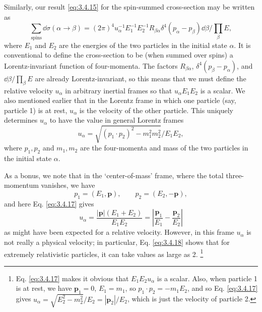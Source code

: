 Similarly, our result \eqref{eq:3.4.15} for the spin-summed cross-section may be written as
\[
 \sum_{\mathrm{spins}}\dd\sigma(\alpha\to\beta)
 =(2\pi)^4u_\alpha^{-1}E_1^{-1}E_2^{-1}R_{\beta\alpha}
 \delta^4(p_\alpha-p_\beta)\dd\beta/\prod_\beta E,
\]
where $E_1$ and $E_2$ are the energies of the two particles in the initial state $\alpha$.
It is conventional to define the cross-section to be (when summed over spins) a Lorentz-invariant
function of four-momenta. The factors $R_{\beta\alpha}$, $\delta^4(p_\beta-p_\alpha)$, and
$\dd\beta/\prod_\beta E$ are already Lorentz-invariant, so this means that we must define the
relative velocity $u_\alpha$ in arbitrary inertial frames so that $u_\alpha E_1E_2$ is a scalar.
We also mentioned earlier that in the Lorentz frame in which one particle (say, particle 1) is
at rest, $u_\alpha$ is the velocity of the other particle. This uniquely determines $u_\alpha$
to have the value in general Lorentz frames
\begin{equation}
 u_\alpha=\sqrt{(p_1\cdot p_2)^2-m_1^2m_2^2}\big/E_1E_2,
 \tag{3.4.17}\label{eq:3.4.17}
\end{equation}
where $p_1,p_2$ and $m_1,m_2$ are the four-momenta and mass of the two particles in the initial
state $\alpha$.

As a bonus, we note that in the `center-of-mass' frame, where the total three-momentum vanishes,
we have
\[
 p_1=(E_1,\mathbf{p}),\qquad p_2=(E_2,-\mathbf{p}),
\]
and here Eq. \eqref{eq:3.4.17} gives
\begin{equation}
 u_\alpha=\frac{|\mathbf{p}|(E_1+E_2)}{E_1E_2}
 =\left|\frac{\mathbf{p}_1}{E_1}-\frac{\mathbf{p}_2}{E_2}\right|
 \tag{3.4.18}\label{eq:3.4.18}
\end{equation}
as might have been expected for a relative velocity. However, in this frame $u_\alpha$ is not
really a physical velocity; in particular, Eq. \eqref{eq:3.4.18} shows that for extremely relativistic
particles, it can take values as large as 2.
\footnote{Eq. \eqref{eq:3.4.17} makes it obvious that $E_1E_2u_\alpha$ is a scalar. Also, when particle 1
is at rest, we have $\mathbf{p}_1=0$, $E_1=m_1$, so $p_1\cdot p_2=-m_1E_2$, and so Eq. \eqref{eq:3.4.17}
gives $u_\alpha=\sqrt{E_2^2-m_2^2}/E_2=|\mathbf{p}_2|/E_2$, which is just the velocity of
particle 2.}

